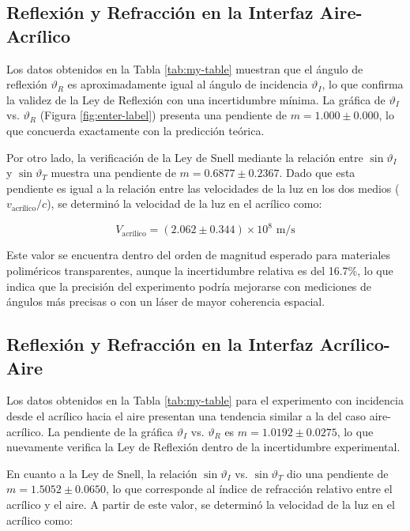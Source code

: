 \documentclass[article,12pt]{elsarticle}
\begin{document}
\begin{enumerate}
\subsection{Reflexión y Refracción en la Interfaz Aire-Acrílico}
Los datos obtenidos en la Tabla \ref{tab:my-table} muestran que el ángulo de reflexión $\vartheta_R$ es aproximadamente igual al ángulo de incidencia $\vartheta_I$, lo que confirma la validez de la Ley de Reflexión con una incertidumbre mínima. La gráfica de $\vartheta_I$ vs. $\vartheta_R$ (Figura \ref{fig:enter-label}) presenta una pendiente de $m = 1.000 \pm 0.000$, lo que concuerda exactamente con la predicción teórica.

Por otro lado, la verificación de la Ley de Snell mediante la relación entre $\sin \vartheta_I$ y $\sin \vartheta_T$ muestra una pendiente de $m = 0.6877 \pm 0.2367$. Dado que esta pendiente es igual a la relación entre las velocidades de la luz en los dos medios ($v_{\text{acrílico}} / c$), se determinó la velocidad de la luz en el acrílico como:

\begin{equation}
V_{\text{acrílico}} = (2.062 \pm 0.344) \times 10^8 \text{ m/s}
\end{equation}

Este valor se encuentra dentro del orden de magnitud esperado para materiales poliméricos transparentes, aunque la incertidumbre relativa es del 16.7\%, lo que indica que la precisión del experimento podría mejorarse con mediciones de ángulos más precisas o con un láser de mayor coherencia espacial.

\subsection{Reflexión y Refracción en la Interfaz Acrílico-Aire}

Los datos obtenidos en la Tabla \ref{tab:my-table} para el experimento con incidencia desde el acrílico hacia el aire presentan una tendencia similar a la del caso aire-acrílico. La pendiente de la gráfica $\vartheta_I$ vs. $\vartheta_R$ es $m = 1.0192 \pm 0.0275$, lo que nuevamente verifica la Ley de Reflexión dentro de la incertidumbre experimental.

En cuanto a la Ley de Snell, la relación $\sin \vartheta_I$ vs. $\sin \vartheta_T$ dio una pendiente de $m = 1.5052 \pm 0.0650$, lo que corresponde al índice de refracción relativo entre el acrílico y el aire. A partir de este valor, se determinó la velocidad de la luz en el acrílico como:


\end{enumerate}
\end{document}
